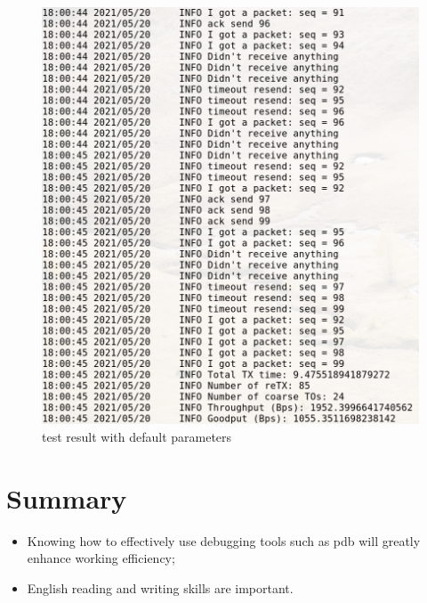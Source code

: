 \documentclass[12pt,a4paper,UTF8]{article}
\begin{document}
\begin{figure}[htbp]
	\centering
	\includegraphics[width=\textwidth]{5}
	\caption{test result with default parameters}
\end{figure}

\newpage
\section{Summary}
\begin{itemize}
	\item Knowing how to effectively use debugging tools such as pdb will greatly enhance working efficiency;
	\item English reading and writing skills are important.
\end{itemize}
\end{document}
